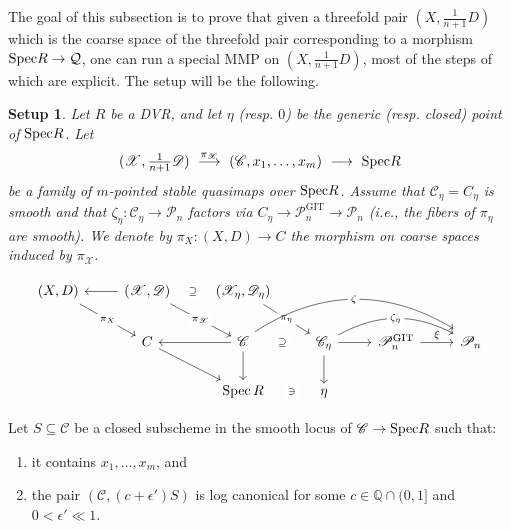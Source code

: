 \documentclass[a4paper,12pt]{amsart}
\newcommand{\cQ}{\mathcal{Q}}
\DeclareMathOperator{\Spec}{Spec}
\DeclareMathOperator{\GIT}{GIT}
\newcommand{\bQ}{{\mathbb Q}}
\newcommand{\sP}{{\mathscr{P}}}
\newcommand{\sD}{{\mathscr{D}}}
\newcommand{\sX}{{\mathscr{X}}}
\newcommand{\sC}{{\mathscr{C}}}
\newcommand\spec{\text{\rm Spec}}
\newtheorem{setup}[theorem]{Setup}
\theoremstyle{definition}
\theoremstyle{remark}
\begin{document}
The goal of this subsection is to prove that given a threefold pair $(X,\frac{1}{n+1}D)$ which is the coarse space of the threefold pair corresponding to a morphism $\spec R \to \cQ$, one can run a special MMP on $(X,\frac{1}{n+1}D)$, most of the steps of which are explicit. The setup will be the following.

\begin{setup}\label{setup_for_existence_of_ruled_model}
\textup{Let $R$ be a DVR, and let $\eta$ (resp. $0$) be the generic (resp. closed) point of $\spec R$. Let $$\textstyle (\sX,\frac{1}{n+1}\sD) \ \stackrel{\pi_\sX}{\longrightarrow} \ (\sC,x_1,\ldots,x_m) \ \longrightarrow \ \spec R $$ be a family of $m$-pointed stable quasimaps over $\spec R$. Assume that $\sC_\eta=C_\eta$ is smooth and that $\zeta_\eta\colon \sC_\eta\to \sP_n$ factors via $C_\eta\to \sP_n^{\GIT}\to \sP_n$ (i.e., the fibers of $\pi_\eta$ are smooth). We denote by $\pi_X\colon (X,D)\rightarrow C$ the morphism on coarse spaces induced by $\pi_{\sX}$.}


\[\begin{tikzcd}
	{(X,D)} & {(\mathscr{X},\mathscr{D})} & {(\mathscr{X}_{\eta},\mathscr{D}_{\eta})} \\
	& C & {\mathscr{C}} & {\mathscr{C}_{\eta}} & {\sP_n^{\GIT}} & {\mathscr{P}_n} \\
	&& {\Spec  R } & {\eta}
	\arrow["{\pi_X}"{description}, from=1-1, to=2-2]
    \arrow[ from=2-2, to=3-3]
	\arrow[from=1-2, to=1-1]
	\arrow["{\pi_{\mathscr{X}}}"{description}, from=1-2, to=2-3]
	\arrow["\supseteq"{description}, draw=none, from=1-3, to=1-2]
	\arrow["{\pi_{\eta}}"{description}, from=1-3, to=2-4]
	\arrow[from=2-3, to=2-2]
	\arrow["\zeta"{description}, shift left, bend left = 32pt, from=2-3, to=2-6]
	\arrow[from=2-3, to=3-3]
	\arrow["\supseteq"{description}, draw=none, from=2-4, to=2-3]
	\arrow[from=2-4, to=2-5]
	\arrow["{\zeta_{\eta}}"{description}, bend left = 28pt, from=2-4, to=2-6]
	\arrow["\xi", from=2-5, to=2-6]
	\arrow["\ni"{description}, draw=none, from=3-4, to=3-3]
    \arrow[ from=2-4, to=3-4]
\end{tikzcd}\]
\end{setup}
\noindent Let $S\subseteq \sC$ be a closed subscheme in the smooth locus of $\sC\to \spec R $ such that:
\begin{enumerate}
    \item it contains $x_1,\ldots,x_m$, and
    \item the pair $(\sC,(c+\epsilon')S)$ is log canonical for some $c\in \bQ\cap (0,1]$ and $0<\epsilon'\ll 1$.
\end{enumerate}
\end{document}
